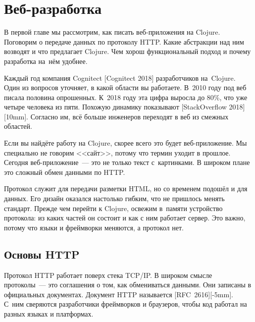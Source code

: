 \chapter{Веб-разработка}

\begin{teaser}
В первой главе мы рассмотрим, как писать веб-приложения на Clojure. Поговорим о
передаче данных по протоколу HTTP. Какие абстракции над ним возводят и что
предлагает Clojure. Чем хорош функциональный подход и почему разработка на~нём
удобнее.
\end{teaser}


Каждый год компания Cognitect [Cognitect 2018]
разработчиков на~Clojure. Один из вопросов уточняет, в какой области вы
работаете. В~2010 году под веб писала половина опрошенных. К~2018 году эта цифра
выросла до 80\%, что уже четыре человека из пяти. Похожую динамику показывают [Stack\-Overflow 2018][10mm].
Согласно им, всё больше инженеров переходят в веб из смежных областей.

Если вы найдёте работу на Clojure, скорее всего это будет веб-приложение. Мы
специально не говорим <<сайт>>, потому что термин уходит в прошлое. Сегодня
веб-приложение~--- это не только текст с~картинками. В широком плане это сложный
обмен данными по HTTP.

Протокол служит для передачи разметки HTML, но со временем подошёл и для
данных. Его дизайн оказался настолько гибким, что не пришлось менять
стандарт. Прежде чем перейти к Clojure, освежим в~памяти устройство протокола:
из каких частей он состоит и как с ним работает сервер. Это важно, потому что
языки и фреймворки меняются, а протокол нет.

\section{Основы HTTP}


Протокол HTTP работает поверх стека TCP/IP. В широком смысле протоколы~--- это
соглашения о том, как обмениваться данными. Они записаны в официальных
документах. Документ HTTP называется [RFC~2616][-5mm].
С~ним сверяются разработчики фреймворков и браузеров, чтобы код работал
на разных языках и платформах.

